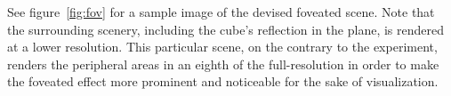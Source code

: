 See figure~\ref{fig:fov} for a sample image of the devised foveated scene.
Note that the surrounding scenery, including the cube's reflection in the plane, is rendered at a lower resolution.
This particular scene, on the contrary to the experiment, renders the peripheral areas in an eighth of the full-resolution in order to make the foveated effect more prominent and noticeable for the sake of visualization.
